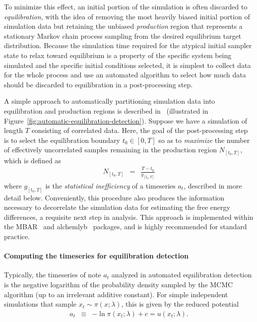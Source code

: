 \documentclass[9pt,bestpractices]{livecoms}
\begin{document}
To minimize this effect, an initial portion of the simulation is often discarded to \emph{equilibration}, with the idea of removing the most heavily biased initial portion of simulation data but retaining the unbiased \emph{production} region that represents a stationary Markov chain process sampling from the desired equilibrium target distribution.
Because the simulation time required for the atypical initial sampler state to relax toward equilibrium is a property of the specific system being simulated and the specific initial conditions selected, it is simplest to collect data for the whole process and use an automated algorithm to select how much data should be discarded to equilibration in a post-processing step.

A simple approach to automatically partitioning simulation data into equilibration and production regions is described in~\cite{chodera2016simple} (illustrated in Figure~\ref{fig:automatic-equilibration-detection}).
Suppose we have a simulation of length $T$ consisting of correlated data.
Here, the goal of the post-processing step is to select the equilibration boundary $t_0 \in [0, T]$ so as to \emph{maximize} the number of effectively uncorrelated samples remaining in the production region $N_{[t_0,T]}$, which is defined as
\begin{eqnarray}
N_{[t_0,T]} &=& \frac{T - t_0}{g_{[t_0,T]}}
\end{eqnarray}
where $g_{[t_0,T]}$ is the \emph{statistical inefficiency} of a timeseries $a_t$, described in more detail below.
Conveniently, this procedure also produces the information necessary to decorrelate the simulation data for estimating the free energy differences, a requisite next step in analysis.
This approach is implemented within the MBAR~\cite{kylebeauchamp2019choderalab} and alchemlyb~\cite{daviddotson2019alchemistry} packages, and is highly recommended for standard practice.

\paragraph{Computing the timeseries for equilibration detection}
Typically, the timeseries of note $a_t$ analyzed in automated equilibration detection is the negative logarithm of the probability density sampled by the MCMC algorithm (up to an irrelevant additive constant).
For simple independent simulations that sample $x_t \sim \pi(x ; \lambda)$, this is given by the reduced potential
\begin{eqnarray}
a_t &\equiv& - \ln \pi(x_t; \lambda) + c = u(x_t; \lambda) .
\end{eqnarray}
\end{document}
